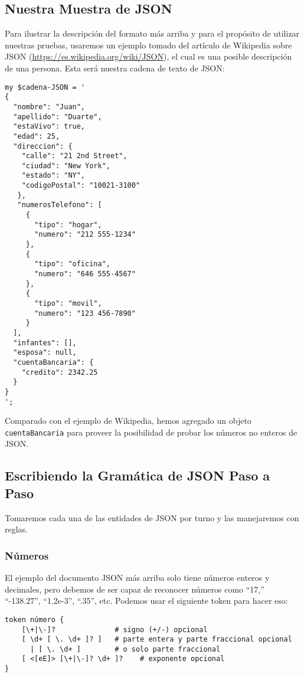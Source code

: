 \subsection{Nuestra Muestra de JSON}


Para ilustrar la descripción del formato más arriba y para
el propósito de utilizar nuestras pruebas, usaremos un ejemplo
tomado del artículo de Wikipedia sobre JSON
(\url{https://es.wikipedia.org/wiki/JSON}), el cual es una
posible descripción de una persona. Esta será nuestra cadena
de texto de JSON:

\begin{verbatim}
my $cadena-JSON = '
{
  "nombre": "Juan",
  "apellido": "Duarte",
  "estaVivo": true,
  "edad": 25,
  "direccion": {
    "calle": "21 2nd Street",
	"ciudad": "New York",
	"estado": "NY",
	"codigoPostal": "10021-3100"
   },
   "numerosTelefono": [
     {
       "tipo": "hogar",
       "numero": "212 555-1234"
     },
     {
       "tipo": "oficina",
       "numero": "646 555-4567"
     },
     {
       "tipo": "movil",
       "numero": "123 456-7890"
     }
  ],
  "infantes": [],
  "esposa": null,  
  "cuentaBancaria": {
    "credito": 2342.25
  }
}
';
\end{verbatim}

Comparado con el ejemplo de Wikipedia, hemos agregado
un objeto \verb|cuentaBancaria| para proveer la posibilidad
de probar los números no enteros de JSON.
 
\subsection{Escribiendo la Gramática de JSON Paso a Paso}

Tomaremos cada una de las entidades de JSON por turno y 
las manejaremos con reglas.

\subsubsection{Números}

El ejemplo del documento JSON más arriba solo tiene números enteros
y decimales, pero debemos de ser capaz de reconocer números
como ``17,'' ``-138.27'', ``1.2e-3'', ``.35'', etc. Podemos usar el
siguiente token para hacer eso:

\begin{verbatim}
token número {
    [\+|\-]?              # signo (+/-) opcional
    [ \d+ [ \. \d+ ]? ]   # parte entera y parte fraccional opcional
      | [ \. \d+ ]        # o solo parte fraccional
    [ <[eE]> [\+|\-]? \d+ ]?    # exponente opcional
}
\end{verbatim}

